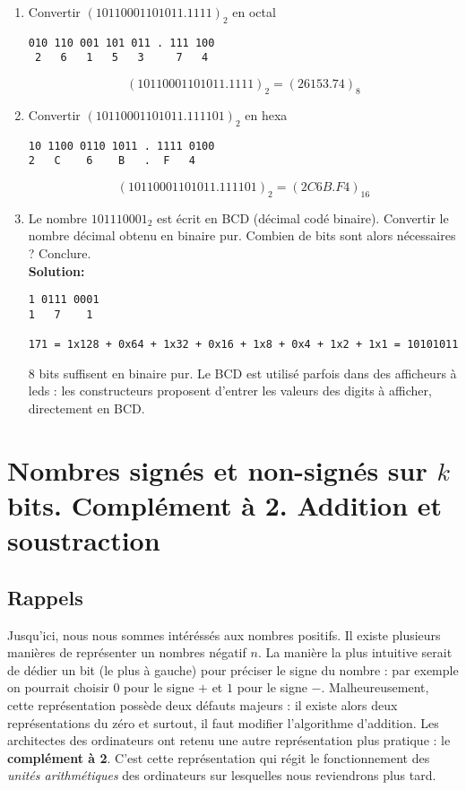 \documentclass[a4paper,11pt]{article}
\begin{document}
\begin{enumerate}
\item { Convertir $(10110001101011.1111 )_2$ en octal}
\begin{verbatim}
010 110 001 101 011 . 111 100
 2   6   1   5   3     7   4
\end{verbatim}
$$( 10110001101011.1111 )_2 = ( 26153.74 )_8$$


\item { Convertir  $(10110001101011.111101 )_2$ en hexa}\\
\begin{verbatim}
10 1100 0110 1011 . 1111 0100
2   C    6    B   .  F   4
\end{verbatim}
$$( 10110001101011.111101 )_2 = ( 2C6B.F4 )_16$$

\item {Le nombre $101110001_2$ est écrit en BCD (décimal codé binaire). Convertir le nombre décimal obtenu en binaire pur. Combien de bits sont alors nécessaires ? Conclure.}\\
{\bf Solution:}
\begin{verbatim}
1 0111 0001
1   7    1

171 = 1x128 + 0x64 + 1x32 + 0x16 + 1x8 + 0x4 + 1x2 + 1x1 = 10101011
\end{verbatim}
8 bits suffisent en binaire pur. Le BCD est utilisé parfois dans des afficheurs à leds : les constructeurs proposent d'entrer les valeurs des digits à afficher, directement en BCD.

\end{enumerate}

\section{Nombres signés et non-signés sur $k$ bits. Complément à 2. Addition et soustraction}

\subsection*{Rappels} Jusqu'ici, nous nous sommes intéréssés aux nombres positifs. Il existe plusieurs manières de représenter un nombres négatif $n$. La manière la plus intuitive serait de dédier un bit (le plus à gauche) pour préciser le signe du nombre : par exemple on pourrait choisir $0$ pour le signe $+$ et $1$ pour le signe $-$. Malheureusement, cette représentation possède deux défauts majeurs : il existe alors deux représentations du zéro et surtout, il faut modifier l'algorithme d'addition. Les architectes des ordinateurs ont retenu une autre représentation plus pratique : le {\bf complément à 2}. C'est cette représentation qui régit le fonctionnement des {\it unités arithmétiques} des ordinateurs sur lesquelles nous reviendrons plus tard.\\
\end{document}
